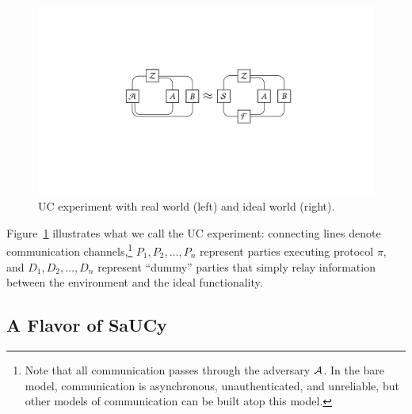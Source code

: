 \begin{figure}
  \centering
  \includegraphics[width=0.85\linewidth]{graphics/suc-experiment}
  \caption{UC experiment with real world (left) and ideal world (right).}
  \label{fig:uc-experiment}
\end{figure}

Figure~\ref{fig:uc-experiment} illustrates what we call the UC experiment:
connecting lines denote communication channels,\footnote{Note that all
  communication passes through the adversary $\mathcal{{A}}$. In the bare model,
  communication is asynchronous, unauthenticated, and unreliable, but other
  models of communication can be built atop this model.} $P_1, P_2, \ldots, P_n$
represent parties executing protocol $\pi$, and $D_1, D_2, \ldots, D_n$ represent
``dummy'' parties that simply relay information between the environment and the
ideal functionality.

\subsection{A Flavor of SaUCy}
\label{subsec:sauce-flavored}



